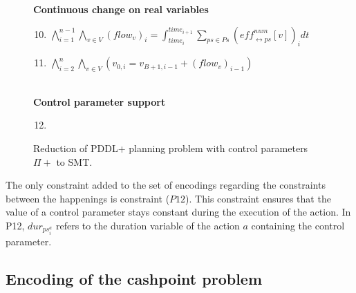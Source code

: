 \begin{figure}[thb!]
\begin{minipage}[t]{0.6\linewidth}
\begin{enumerate}[label=P\arabic*.]
\end{enumerate}
\textbf{Continuous change on real variables}
\begin{enumerate}[label=P\arabic*.]\setcounter{enumi}{9}
\item $\bigwedge_{i=1}^{n-1} \bigwedge_{v\in V} (flow_v)_i = \int^{time_{i+1}}_{time_i} \sum_{ps\in Ps} (\mathit{eff}^{num}_{\leftrightarrow ps}[v])_idt$
 \item $\bigwedge_{i=2}^n \bigwedge_{v\in V} (v_{0,i} = v_{B+1,i-1} + (flow_v)_{i-1})$
\end{enumerate}
\end{minipage}
\vspace{1em}\\\textbf{Control parameter support}
\begin{enumerate}[label=P\arabic*.]\setcounter{enumi}{11}
 \item {}
\end{enumerate}
\caption{Reduction of PDDL+ planning problem with control parameters $\Pi+$ to SMT.}
\label{eq:plan2}
\end{figure}

The only constraint added to the set of encodings regarding the constraints between the happenings is  constraint ($P12$). This constraint ensures that the value of a control parameter stays constant during the execution of the action. In P12, $dur_{ps^a_i}$ refers to the duration variable of the action $a$ containing the control parameter.

\subsection{Encoding of the cashpoint problem}

